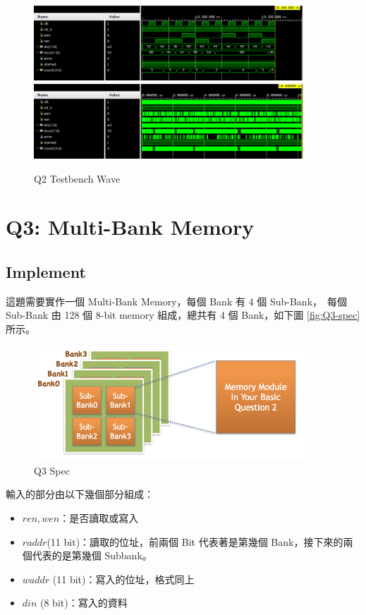 \documentclass[10.5pt,compsoc,UTF8]{CjC}
\theoremstyle{mystyle}
\begin{document}
\begin{figure}[!h]
  \centering
  \includegraphics[width=0.9\textwidth]{./img/Q2-tb-wave1.png}
  \includegraphics[width=0.9\textwidth]{./img/Q2-tb-wave2.png}
  \caption{Q2 Testbench Wave}
  \label{fig:Q2-tb}
\end{figure}

\newpage

\section{Q3: Multi-Bank Memory}
\label{sec:Q3}

\subsection{Implement}

這題需要實作一個 Multi-Bank Memory，每個 Bank 有 4 個 Sub-Bank，\
每個 Sub-Bank 由 128 個 8-bit memory 組成，總共有 4 個 Bank，如下圖 \ref{fig:Q3-spec} 所示。

\begin{figure}[!h]
  \centering
  \includegraphics[width=0.9\textwidth]{./img/Q3-spec.png}
  \caption{Q3 Spec}
  \label{fig:Q2-spec}
\end{figure}

輸入的部分由以下幾個部分組成：
\begin{itemize}
  \item $ren, wen$：是否讀取或寫入
  \item $raddr$(11 bit)：讀取的位址，前兩個 Bit 代表著是第幾個 Bank，接下來的兩個代表的是第幾個 Subbank。
  \item $waddr$ (11 bit)：寫入的位址，格式同上
  \item $din$ (8 bit)：寫入的資料
\end{itemize}
\end{document}
